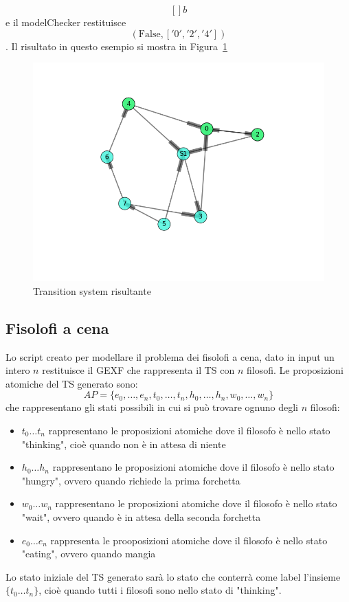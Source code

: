 \documentclass[a4paper, 10pt]{article}
\numberwithin{equation}{theor}
\begin{document}
$$[] b$$
e il modelChecker restituisce
$$(\text{False}, ['0', '2', '4'])$$.
Il risultato in questo esempio si mostra in Figura~\ref{tsResult2}
\begin{figure}
  \includegraphics[width=\linewidth]{img/tsResult2.png}
  \caption{Transition system risultante}
  \label{tsResult2}
\end{figure}

\subsection{Fisolofi a cena}

Lo script creato per modellare il problema dei fisolofi a cena, dato in input un intero $n$ restituisce il \ac{GEXF} che rappresenta il \ac{TS} con $n$ filosofi.
Le proposizioni atomiche del \ac{TS} generato sono:
$$AP = \{e_0, \dots, e_n, t_0, \dots, t_n, h_0, \dots, h_n, w_0, \dots, w_n \}$$
che rappresentano gli stati possibili in cui si può trovare ognuno degli $n$ filosofi:
\begin{itemize}
  \item{$t_0 \dots t_n$ rappresentano le proposizioni atomiche dove il filosofo è nello stato "thinking", cioè quando non è in attesa di niente}
  \item{$h_0 \dots h_n$ rappresentano le proposizioni atomiche dove il filosofo è nello stato "hungry", ovvero quando richiede la prima forchetta}
  \item{$w_0 \dots w_n$ rappresentano le proposizioni atomiche dove il filosofo è nello stato "wait", ovvero quando è in attesa della seconda forchetta}
  \item{$e_0 \dots e_n$ rappresenta le prooposizioni atomiche dove il filosofo è nello stato "eating", ovvero quando mangia}
\end{itemize}
Lo stato iniziale del \ac{TS} generato sarà lo stato che conterrà come label l'insieme $\{t_0 \dots t_n\}$, cioè quando tutti i filosofi sono nello stato di "thinking".
\end{document}
